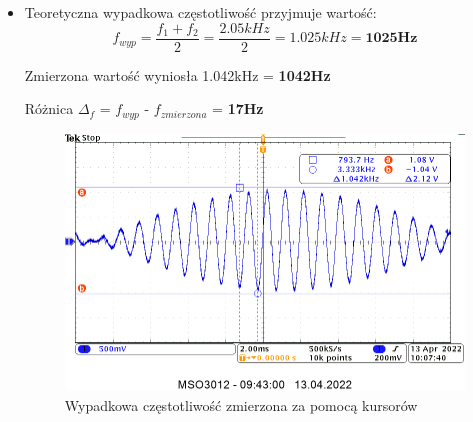 \begin{itemize}
    \item Teoretyczna wypadkowa częstotliwość przyjmuje wartość:
        \begin{equation}
            f_{wyp} = \frac{f_1 + f_2}{2} = \frac{2.05kHz}{2} = 1.025kHz = \textbf{1025Hz}
        \end{equation}
        \begin{center}
            Zmierzona wartość wyniosła 1.042kHz = \textbf{1042Hz}
        \end{center}
        \begin{center}
            Różnica $\Delta_f$ = $f_{wyp}$ - $f_{zmierzona}$ = \textbf{17Hz}
        \end{center}
        \begin{figure}[H]
            \centering
            \includegraphics[scale=0.33]{img/osciloscope/1_3_dudnienia2_cropped.png}
            \caption{Wypadkowa częstotliwość zmierzona za pomocą kursorów}
            \label{fig:wypadkowa}
        \end{figure}
        

\end{itemize}
